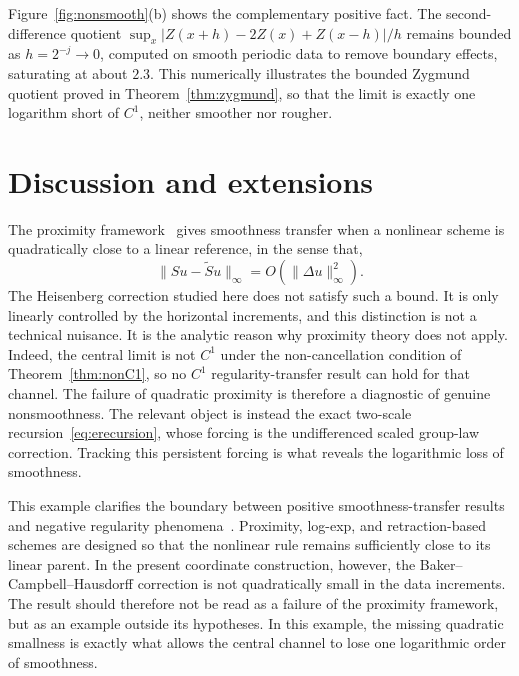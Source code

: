 \documentclass{article}
\theoremstyle{plain}
\theoremstyle{definition}
\newcommand{\norm}[1]{\lVert #1 \rVert}
\newcommand{\abs}[1]{\lvert #1 \rvert}
\begin{document}
Figure~\ref{fig:nonsmooth}(b) shows the complementary positive fact. The
second-difference quotient $\sup_x\abs{Z(x+h)-2Z(x)+Z(x-h)}/h$ remains bounded
as $h=2^{-j}\to0$, computed on smooth periodic data to remove boundary effects,
saturating at about $2.3$. This numerically illustrates the bounded Zygmund
quotient proved in Theorem~\ref{thm:zygmund}, so that the limit is exactly one
logarithm short of $C^1$, neither smoother nor rougher.



\section{Discussion and extensions}\label{sec:discussion}

The proximity framework~\cite{WallnerDyn05, Wallner06, Grohs10prox,
GrohsWallner09} gives smoothness transfer when a nonlinear scheme is
quadratically close to a linear reference, in the sense that,
\[
\norm{Su-\tilde{S}u}_\infty = O(\norm{\Delta u}_\infty^2).
\]
The Heisenberg correction studied here does not satisfy such a bound. It is only
linearly controlled by the horizontal increments, and this distinction is not a
technical nuisance. It is the analytic reason why proximity theory does not
apply. Indeed, the central limit is not $C^1$ under the non-cancellation
condition of Theorem~\ref{thm:nonC1}, so no $C^1$ regularity-transfer result can
hold for that channel. The failure of quadratic proximity is therefore a
diagnostic of genuine nonsmoothness. The relevant object is instead the exact
two-scale recursion~\eqref{eq:erecursion}, whose forcing is the undifferenced
scaled group-law correction. Tracking this persistent forcing is what reveals
the logarithmic loss of smoothness.

This example clarifies the boundary between positive smoothness-transfer
results and negative regularity phenomena~\cite{XieYu08, XieYu10}. Proximity,
log-exp, and retraction-based schemes are designed so that the nonlinear rule
remains sufficiently close to its linear parent. In the present coordinate
construction, however, the Baker--Campbell--Hausdorff correction is not
quadratically small in the data increments. The result should therefore not be
read as a failure of the proximity framework, but as an example outside its
hypotheses. In this example, the missing quadratic smallness is exactly what
allows the central channel to lose one logarithmic order of smoothness.
\end{document}
